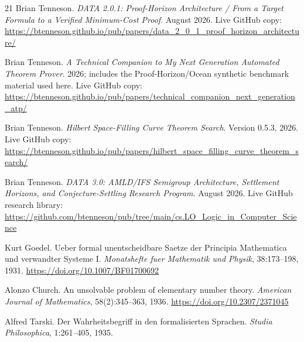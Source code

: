 \begin{thebibliography}{21}
Brian Tenneson.
\emph{DATA 2.0.1: Proof-Horizon Architecture / From a Target Formula to a Verified Minimum-Cost Proof}.
August 2026. Live GitHub copy:
\url{https://btenneson.github.io/pub/papers/data_2_0_1_proof_horizon_architecture/}

Brian Tenneson.
\emph{A Technical Companion to My Next Generation Automated Theorem Prover}.
2026; includes the Proof-Horizon/Ocean synthetic benchmark material used here. Live GitHub copy:
\url{https://btenneson.github.io/pub/papers/technical_companion_next_generation_atp/}

Brian Tenneson.
\emph{Hilbert Space-Filling Curve Theorem Search}.
Version 0.5.3, 2026. Live GitHub copy:
\url{https://btenneson.github.io/pub/papers/hilbert_space_filling_curve_theorem_search/}

Brian Tenneson.
\emph{DATA 3.0: AMLD/IFS Semigroup Architecture, Settlement Horizons, and Conjecture-Settling Research Program}.
August 2026. Live GitHub research library:
\url{https://github.com/btenneson/pub/tree/main/cs.LO_Logic_in_Computer_Science}

Kurt Goedel.
Ueber formal unentscheidbare Saetze der Principia Mathematica und verwandter Systeme I.
\emph{Monatshefte fuer Mathematik und Physik}, 38:173--198, 1931.
\url{https://doi.org/10.1007/BF01700692}

Alonzo Church.
An unsolvable problem of elementary number theory.
\emph{American Journal of Mathematics}, 58(2):345--363, 1936.
\url{https://doi.org/10.2307/2371045}

Alfred Tarski.
Der Wahrheitsbegriff in den formalisierten Sprachen.
\emph{Studia Philosophica}, 1:261--405, 1935.

\end{thebibliography}


